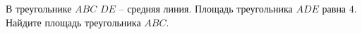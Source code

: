 \begin{ex}
	\begin{condition}
		В треугольнике \( ABC \) \(  DE \) – средняя линия. Площадь треугольника \( ADE \) равна \( 4 \). Найдите площадь треугольника \( ABC \).
	\end{condition}
\end{ex}